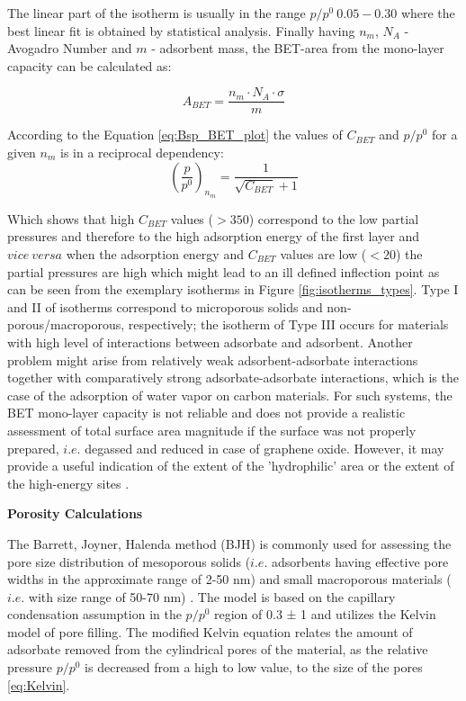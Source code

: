 The linear part of the isotherm is usually in the range  \(p/p^0 ~ 0.05-0.30 \) where the best linear fit is obtained by statistical analysis. Finally having $n_m$, $N_A$ - Avogadro Number and $m$ - adsorbent mass, the BET-area from the mono-layer capacity can be calculated as:

\begin{equation}
    A_{BET} = \frac{n_m \cdot N_A \cdot \sigma}{m}
\end{equation}

According to the Equation \ref{eq:Bsp_BET_plot} the values of $C_{BET}$  and \(p/p^0\) for a given $n_m$ is in a reciprocal dependency:
\begin{equation}
    \left(\frac{p}{p^0}\right)_{n_m}=\frac{1}{\sqrt{C_{BET}}+1}
\end{equation}

Which shows that high $C_{BET}$ values ($>350$) correspond to the low partial pressures and therefore to the high adsorption energy of the first layer and $vice\:versa$ when the adsorption energy and $C_{BET}$ values are low ($ < 20$) the partial pressures are high which might lead to an ill defined inflection point \cite{ROUQUEROL1999165} as can be seen from the exemplary isotherms in Figure \ref{fig:isotherms_types}. Type I and II of isotherms correspond to microporous solids and non-porous/macroporous,  respectively; the isotherm of Type III occurs for materials with high level of interactions between adsorbate and adsorbent. Another problem might arise from relatively weak adsorbent-adsorbate interactions together with comparatively strong adsorbate-adsorbate interactions, which is the case of the adsorption of water vapor on carbon materials.  For such systems, the BET mono-layer capacity is not reliable and does not provide a realistic assessment of total surface area magnitude if the surface was not properly prepared, $i.e.$ degassed and reduced in case of graphene oxide. However, it may provide a useful indication of the extent of the 'hydrophilic' area or the extent of the high-energy sites \cite{ROUQUEROL1999237}. 

\medskip
\textbf{Porosity Calculations}

The Barrett, Joyner, Halenda method (BJH) is commonly used for assessing the pore size distribution of mesoporous solids ($i.e.$ adsorbents having effective pore widths in the approximate range of 2-50 nm) and small macroporous materials ($i.e.$ with size range of 50-70 nm) . The model is based on the capillary condensation assumption in the $p/p^0$ region of 0.3 ± 1 and utilizes the Kelvin model of pore filling. The modified Kelvin equation \cite{ROUQUEROL1999165} relates the amount of adsorbate removed from the cylindrical pores of the material, as the relative pressure $p/p^0$ is decreased from a high to low value, to the size of the pores \ref{eq:Kelvin}. 

